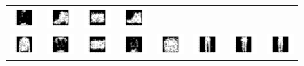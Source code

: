 \documentclass[12pt]{report}
\begin{document}
\begin{figure}[H]
\begin{tabular}{cccccccc}
  \includegraphics[width=0.1\linewidth]{qn2_i_12.png} &   \includegraphics[width=0.1\linewidth]{qn2_i_13.png} &
  \includegraphics[width=0.1\linewidth]{qn2_i_14.png} &   \includegraphics[width=0.1\linewidth]{qn2_i_15.png} \\
  \includegraphics[width=0.1\linewidth]{qn2_i_16.png} &   \includegraphics[width=0.1\linewidth]{qn2_i_17.png} &
  \includegraphics[width=0.1\linewidth]{qn2_i_18.png} &   \includegraphics[width=0.1\linewidth]{qn2_i_19.png} &
  \includegraphics[width=0.1\linewidth]{qn2_i_20.png} &   \includegraphics[width=0.1\linewidth]{qn2_i_21.png} &
  \includegraphics[width=0.1\linewidth]{qn2_i_22.png} &   \includegraphics[width=0.1\linewidth]{qn2_i_23.png} \\

\end{tabular}
\end{figure}
\end{document}
